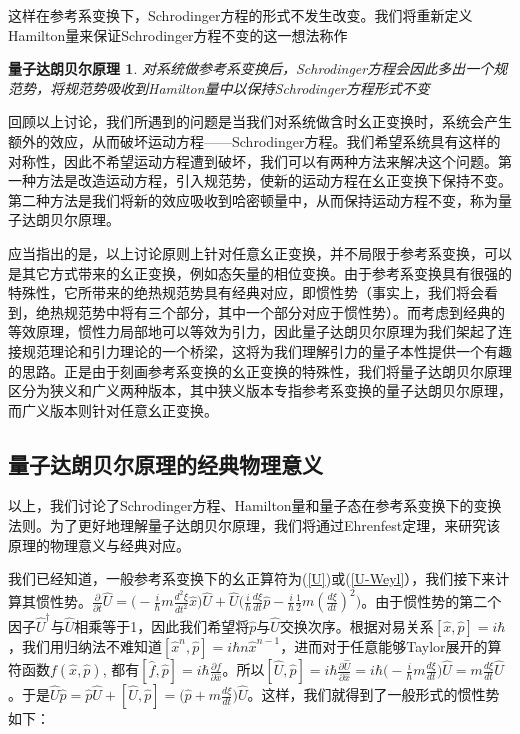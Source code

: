 \documentclass[a4paper]{article}
\newtheorem*{D'Alembert}{量子达朗贝尔原理}
\begin{document}
\begin{itemize}
            这样在参考系变换下，Schrodinger方程的形式不发生改变。我们将重新定义Hamilton量来保证Schrodinger方程不变的这一想法称作

            \begin{D'Alembert}
                对系统做参考系变换后，Schrodinger方程会因此多出一个规范势，将规范势吸收到Hamilton量中以保持Schrodinger方程形式不变
            \end{D'Alembert}
            
        \end{itemize}

        回顾以上讨论，我们所遇到的问题是当我们对系统做含时幺正变换时，系统会产生额外的效应，从而破坏运动方程——Schrodinger方程。我们希望系统具有这样的对称性，因此不希望运动方程遭到破坏，我们可以有两种方法来解决这个问题。第一种方法是改造运动方程，引入规范势，使新的运动方程在幺正变换下保持不变。第二种方法是我们将新的效应吸收到哈密顿量中，从而保持运动方程不变，称为量子达朗贝尔原理。

        应当指出的是，以上讨论原则上针对任意幺正变换，并不局限于参考系变换，可以是其它方式带来的幺正变换，例如态矢量的相位变换。由于参考系变换具有很强的特殊性，它所带来的绝热规范势具有经典对应，即惯性势（事实上，我们将会看到，绝热规范势中将有三个部分，其中一个部分对应于惯性势）。而考虑到经典的等效原理，惯性力局部地可以等效为引力，因此量子达朗贝尔原理为我们架起了连接规范理论和引力理论的一个桥梁，这将为我们理解引力的量子本性提供一个有趣的思路。正是由于刻画参考系变换的幺正变换的特殊性，我们将量子达朗贝尔原理区分为狭义和广义两种版本，其中狭义版本专指参考系变换的量子达朗贝尔原理，而广义版本则针对任意幺正变换。

    \subsection{量子达朗贝尔原理的经典物理意义}

        以上，我们讨论了Schrodinger方程、Hamilton量和量子态在参考系变换下的变换法则。为了更好地理解量子达朗贝尔原理，我们将通过Ehrenfest定理，来研究该原理的物理意义与经典对应。

        我们已经知道，一般参考系变换下的幺正算符为(\ref{U})或(\ref{U-Weyl}），我们接下来计算其惯性势。$\frac{\partial}{\partial t}\hat{U} = \big(-\frac{i}{\hbar}m\frac{d^2 \xi}{dt^2} \hat{x}\big)\hat{U} + \hat{U}\big(\frac{i}{\hbar}\frac{d\xi}{dt}\hat{p} - \frac{i}{\hbar}\frac{1}{2}m(\frac{d\xi}{dt})^2\big)$。由于惯性势的第二个因子$\hat{U}^\dagger$与$\hat{U}$相乘等于1，因此我们希望将$\hat{p}$与$\hat{U}$交换次序。根据对易关系$[\hat{x},\hat{p}]=i\hbar$，我们用归纳法不难知道$[\hat{x}^n,\hat{p}]=i\hbar n\hat{x}^{n-1}$，进而对于任意能够Taylor展开的算符函数$f(\hat{x},\hat{p})$, 都有$[\hat{f}, \hat{p}]=i\hbar\frac{\partial f}{\partial\hat{x}}$。所以$[\hat{U}, \hat{p}] = i\hbar\frac{\partial\hat{U}}{\partial\hat{x}} = i\hbar\big(-\frac{i}{\hbar}m\frac{d\xi}{dt}\big)\hat{U} = m\frac{d\xi}{dt}\hat{U}$。于是$\hat{U}\hat{p} = \hat{p}\hat{U} + [\hat{U}, \hat{p}] = \big(\hat{p}+m\frac{d\xi}{dt}\big)\hat{U}$。这样，我们就得到了一般形式的惯性势如下：
\end{document}
